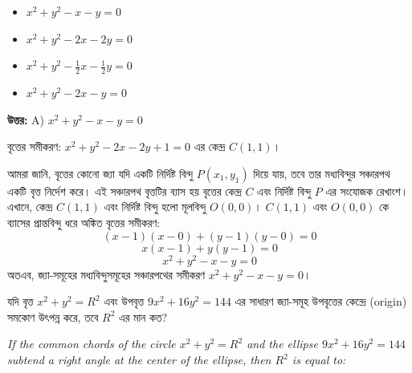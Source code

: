 \documentclass[12pt, a4paper]{article}
\begin{document}
\begin{itemize}[label={}, leftmargin=1cm, itemsep=0.5em]
    \item[\textbf{A)}] $x^2 + y^2 - x - y = 0$
    \item[\textbf{B)}] $x^2 + y^2 - 2x - 2y = 0$
    \item[\textbf{C)}] $x^2 + y^2 - \frac{1}{2}x - \frac{1}{2}y = 0$
    \item[\textbf{D)}] $x^2 + y^2 - 2x - y = 0$
\end{itemize}

\vspace{0.5em}
\begin{tcolorbox}[answerbox]
    \textbf{\color{success} উত্তর:} A) $x^2 + y^2 - x - y = 0$
\end{tcolorbox}
\vspace{1em}

\begin{tcolorbox}[solutionbox={সমাধান (Solution)}]
    \noindent
    বৃত্তের সমীকরণ: $x^2 + y^2 - 2x - 2y + 1 = 0$ এর কেন্দ্র $C(1, 1)$। 
    
    \vspace{0.5em}
    আমরা জানি, বৃত্তের কোনো জ্যা যদি একটি নির্দিষ্ট বিন্দু $P(x_1, y_1)$ দিয়ে যায়, তবে তার মধ্যবিন্দুর সঞ্চারপথ একটি বৃত্ত নির্দেশ করে। এই সঞ্চারপথ বৃত্তটির ব্যাস হয় বৃত্তের কেন্দ্র $C$ এবং নির্দিষ্ট বিন্দু $P$ এর সংযোজক রেখাংশ। 
    এখানে, কেন্দ্র $C(1, 1)$ এবং নির্দিষ্ট বিন্দু হলো মূলবিন্দু $O(0, 0)$। $C(1, 1)$ এবং $O(0, 0)$ কে ব্যাসের প্রান্তবিন্দু ধরে অঙ্কিত বৃত্তের সমীকরণ:
    \[ (x - 1)(x - 0) + (y - 1)(y - 0) = 0 \]
    \[ x(x - 1) + y(y - 1) = 0 \]
    \[ x^2 + y^2 - x - y = 0 \]
    অতএব, জ্যা-সমূহের মধ্যবিন্দুসমূহের সঞ্চারপথের সমীকরণ $x^2 + y^2 - x - y = 0$।
\end{tcolorbox}

\begin{tcolorbox}[questionbox={প্রশ্ন (Question) 14}]
    \noindent
    যদি বৃত্ত $x^2 + y^2 = R^2$ এবং উপবৃত্ত $9x^2 + 16y^2 = 144$ এর সাধারণ জ্যা-সমূহ উপবৃত্তের কেন্দ্রে (origin) সমকোণ উৎপন্ন করে, তবে $R^2$ এর মান কত?
    
    \vspace{0.8em}
    \begin{english}
    \noindent\textit{\color{darkgray}
    If the common chords of the circle $x^2 + y^2 = R^2$ and the ellipse $9x^2 + 16y^2 = 144$ subtend a right angle at the center of the ellipse, then $R^2$ is equal to:
    }
    \end{english}
\end{tcolorbox}
\end{document}
